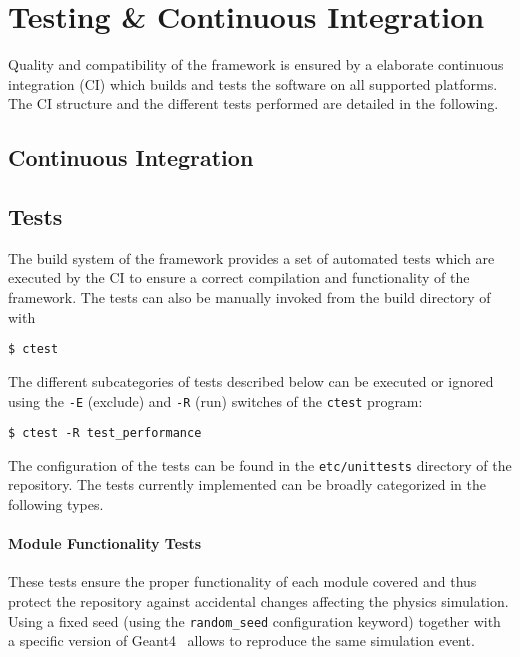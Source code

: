 \section{Testing \& Continuous Integration}
\label{sec:testing}

Quality and compatibility of the \apsq framework is ensured by a elaborate continuous integration (CI) which builds and tests the software on all supported platforms.
The CI structure and the different tests performed are detailed in the following.

\subsection{Continuous Integration}
\label{sec:ci}

\subsection{Tests}

The build system of the framework provides a set of automated tests which are executed by the CI to ensure a correct compilation and functionality of the framework.
The tests can also be manually invoked from the build directory of \apsq with
\begin{verbatim}
$ ctest
\end{verbatim}

The different subcategories of tests described below can be executed or ignored using the \texttt{-E} (exclude) and \texttt{-R} (run) switches of the \texttt{ctest} program:
\begin{verbatim}
$ ctest -R test_performance
\end{verbatim}

The configuration of the tests can be found in the \texttt{etc/unittests} directory of the repository.
The tests currently implemented can be broadly categorized in the following types.

\paragraph{Module Functionality Tests}
\label{sec:tests}

These tests ensure the proper functionality of each module covered and thus protect the repository against accidental changes affecting the physics simulation.
Using a fixed seed (using the \texttt{random\_seed} configuration keyword) together with a specific version of Geant4~\cite{geant4} allows to reproduce the same simulation event.

